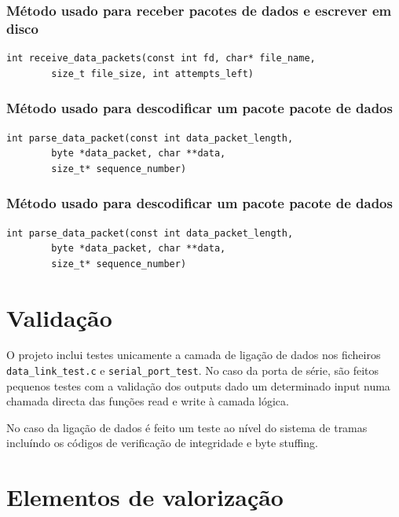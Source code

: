 \documentclass[a4paper,11pt,titlepage]{article}
\begin{document}
\subsubsection*{Método usado para receber pacotes de dados e escrever em disco}
\begin{lstlisting}[style=customc]
int receive_data_packets(const int fd, char* file_name, 
		size_t file_size, int attempts_left)
\end{lstlisting}

\subsubsection*{Método usado para descodificar um pacote pacote de dados}
\begin{lstlisting}[style=customc]
int parse_data_packet(const int data_packet_length,
		byte *data_packet, char **data,
		size_t* sequence_number)
\end{lstlisting}

\subsubsection*{Método usado para descodificar um pacote pacote de dados}
\begin{lstlisting}[style=customc]
int parse_data_packet(const int data_packet_length,
		byte *data_packet, char **data,
		size_t* sequence_number)
\end{lstlisting}

\section{Validação}

O projeto inclui testes unicamente a camada de ligação de dados nos ficheiros \texttt{data\_link\_test.c} e \texttt{serial\_port\_test}. No caso da porta de série, são feitos pequenos testes com a validação dos outputs dado um determinado input numa chamada directa das funções read e write à camada lógica. 

No caso da ligação de dados é feito um teste ao nível do sistema de tramas incluíndo os códigos de verificação de integridade e byte stuffing.

\section{Elementos de valorização}

\end{document}
